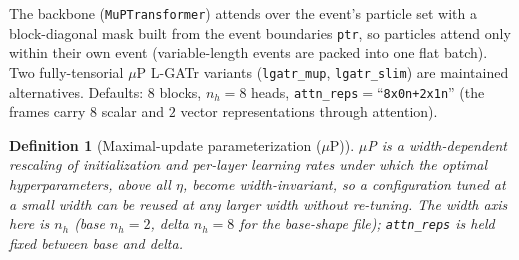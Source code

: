 \documentclass[11pt]{article}
\newcommand{\nh}{n_h}
\newcommand{\code}[1]{\texttt{#1}}
\newtheorem{definition}{Definition}
\begin{document}
\noindent The backbone (\code{MuPTransformer}) attends over the event's particle set with a
block-diagonal mask built from the event boundaries \code{ptr}, so particles attend only within
their own event (variable-length events are packed into one flat batch). Two fully-tensorial
$\mu$P L-GATr variants (\code{lgatr\_mup}, \code{lgatr\_slim}) are maintained alternatives.
Defaults: $8$ blocks, $\nh=8$ heads, \code{attn\_reps}$=$``\code{8x0n+2x1n}'' (the frames carry
$8$ scalar and $2$ vector representations through attention).

\begin{definition}[Maximal-update parameterization ($\mu$P)]\label{def:mup}
$\mu$P is a width-dependent rescaling of initialization and per-layer learning rates
under which the optimal hyperparameters, above all $\eta$, become
\emph{width-invariant}, so a configuration tuned at a small width can be reused at any
larger width without re-tuning. The width axis here is $\nh$ (base $\nh=2$, delta $\nh=8$
for the base-shape file); \code{attn\_reps} is held fixed between base and delta.
\end{definition}
\end{document}
